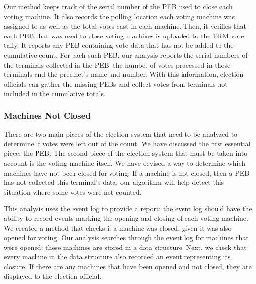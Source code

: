 Our method keeps track of the serial number of the PEB used to close each voting machine. It also records the polling location each voting machine was assigned to as well as the total votes cast in each machine. Then,  it verifies that each PEB that was used to close voting machines is uploaded to the ERM vote tally. It reports any PEB containing vote data that has not be added to the cumulative count.  For each such PEB, our analysis reports the serial numbers of the terminals collected in the PEB, the number of votes processed in those terminals and the precinct's name and number. With this information, election officials can gather the missing PEBs and collect votes from terminals not included in the cumulative totals.

\subsubsection{Machines Not Closed}
There are two main pieces of the election system that need to be analyzed to determine if votes were left out of the count.  We have discussed the first essential piece: the PEB.  The second piece of the election system that must be taken into account is the voting machine itself.   We have devised a way to determine which machines have not been closed for voting.  If a machine is not closed, then a PEB has not collected this terminal's data; our algorithm will help detect this situation where some votes were not counted.  

This analysis uses the event log to provide a report; the event log should have the ability to record events marking the opening and closing of each voting machine.  We created a method that checks if a machine was closed, given it was also opened for voting.  Our analysis searches through the event log for machines that were opened; these machines are stored in a data structure.  Next, we check that every machine in the data structure also recorded an event representing its closure.  If there are any machines that have been opened and not closed, they are displayed to the election official.   
